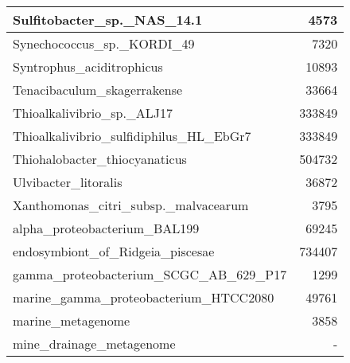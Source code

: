 \documentclass[12pt,a4paper]{article}
\begin{document}
\begin{table}[ht]
\begin{center}
\begin{tabular}{|l*{1}{|r}|}
Sulfitobacter\_sp.\_NAS\_14.1 & 4573 \\ \hline
Synechococcus\_sp.\_KORDI\_49 & 7320 \\ \hline
Syntrophus\_aciditrophicus & 10893 \\ \hline
Tenacibaculum\_skagerrakense & 33664 \\ \hline
Thioalkalivibrio\_sp.\_ALJ17 & 333849 \\ \hline
Thioalkalivibrio\_sulfidiphilus\_HL\_EbGr7 & 333849 \\ \hline
Thiohalobacter\_thiocyanaticus & 504732 \\ \hline
Ulvibacter\_litoralis & 36872 \\ \hline
Xanthomonas\_citri\_subsp.\_malvacearum & 3795 \\ \hline
alpha\_proteobacterium\_BAL199 & 69245 \\ \hline
endosymbiont\_of\_Ridgeia\_piscesae & 734407 \\ \hline
gamma\_proteobacterium\_SCGC\_AB\_629\_P17 & 1299 \\ \hline
marine\_gamma\_proteobacterium\_HTCC2080 & 49761 \\ \hline
marine\_metagenome & 3858 \\ \hline
mine\_drainage\_metagenome & - \\ \hline
\end{tabular}
\end{center}
\end{table}
\end{document}
